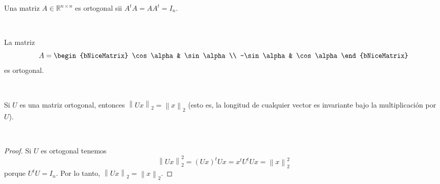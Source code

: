 \documentclass[
	spanish,
	8pt,
	utf8,
	xcolor=table,
	handout,
	aspectratio=169,
	professionalfonts,
	mathserif,
	leqno,
]{beamer}
\begin{document}
\begin{frame}
	\begin{definition}
		Una matriz $A\in\mathbb{R}^{n\times n}$ es \alert{ortogonal} sii
		$A^{t}A=AA^{t}=I_{n}$.
	\end{definition}

	\

	\begin{example}
		La matriz
		\begin{equation*}
			A=
			\begin{bNiceMatrix}
				\cos \alpha  & \sin \alpha \\
				-\sin \alpha & \cos \alpha
			\end{bNiceMatrix}
		\end{equation*}
		es ortogonal.
	\end{example}

	\


	\begin{theorem}
		Si $U$ es una matriz ortogonal, entonces
		\begin{math}
			{\left\|Ux\right\|}_{2}=
				{\left\|x\right\|}_{2}
		\end{math}
		(esto es, la longitud de cualquier vector es invariante bajo la
		multiplicación por $U$).
	\end{theorem}

	\

	\begin{proof}
		Si $U$ es ortogonal tenemos
		\begin{equation*}
			{\left\|Ux\right\|}^{2}_{2}=
				{\left(Ux\right)}^{t}
			Ux=
			x^{t}U^{t}Ux=
				{\left\|x\right\|}^{2}_{2}
		\end{equation*}
		porque $U^{t}U=I_{n}$.
		Por lo tanto,
		\begin{math}
			{\left\|Ux\right\|}_{2}=
				{\left\|x\right\|}_{2}
		\end{math}.
	\end{proof}
\end{frame}
\end{document}
